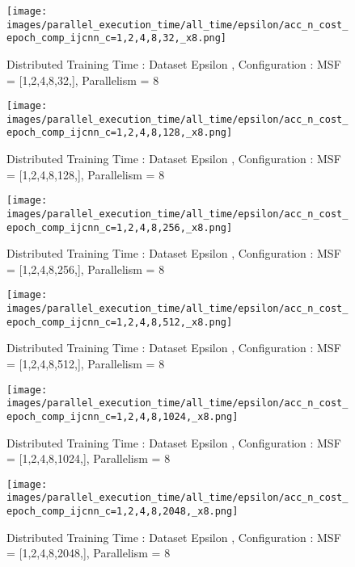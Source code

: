 \begin{figure*}[htbp]
\centering
\texttt{[image: images/parallel\_execution\_time/all\_time/epsilon/acc\_n\_cost\_epoch\_comp\_ijcnn\_c=1,2,4,8,32,\_x8.png]}
\caption{Distributed Training Time : Dataset Epsilon , Configuration : MSF = [1,2,4,8,32,], Parallelism = 8}
\label{fig:dis-msf-tr-time-epsilon-x8}
\end{figure*}


\begin{figure*}[htbp]
\centering
\texttt{[image: images/parallel\_execution\_time/all\_time/epsilon/acc\_n\_cost\_epoch\_comp\_ijcnn\_c=1,2,4,8,128,\_x8.png]}
\caption{Distributed Training Time : Dataset Epsilon , Configuration : MSF = [1,2,4,8,128,], Parallelism = 8}
\label{fig:dis-msf-tr-time-epsilon-x8}
\end{figure*}


\begin{figure*}[htbp]
\centering
\texttt{[image: images/parallel\_execution\_time/all\_time/epsilon/acc\_n\_cost\_epoch\_comp\_ijcnn\_c=1,2,4,8,256,\_x8.png]}
\caption{Distributed Training Time : Dataset Epsilon , Configuration : MSF = [1,2,4,8,256,], Parallelism = 8}
\label{fig:dis-msf-tr-time-epsilon-x8}
\end{figure*}


\begin{figure*}[htbp]
\centering
\texttt{[image: images/parallel\_execution\_time/all\_time/epsilon/acc\_n\_cost\_epoch\_comp\_ijcnn\_c=1,2,4,8,512,\_x8.png]}
\caption{Distributed Training Time : Dataset Epsilon , Configuration : MSF = [1,2,4,8,512,], Parallelism = 8}
\label{fig:dis-msf-tr-time-epsilon-x8}
\end{figure*}


\begin{figure*}[htbp]
\centering
\texttt{[image: images/parallel\_execution\_time/all\_time/epsilon/acc\_n\_cost\_epoch\_comp\_ijcnn\_c=1,2,4,8,1024,\_x8.png]}
\caption{Distributed Training Time : Dataset Epsilon , Configuration : MSF = [1,2,4,8,1024,], Parallelism = 8}
\label{fig:dis-msf-tr-time-epsilon-x8}
\end{figure*}


\begin{figure*}[htbp]
\centering
\texttt{[image: images/parallel\_execution\_time/all\_time/epsilon/acc\_n\_cost\_epoch\_comp\_ijcnn\_c=1,2,4,8,2048,\_x8.png]}
\caption{Distributed Training Time : Dataset Epsilon , Configuration : MSF = [1,2,4,8,2048,], Parallelism = 8}
\label{fig:dis-msf-tr-time-epsilon-x8}
\end{figure*}


